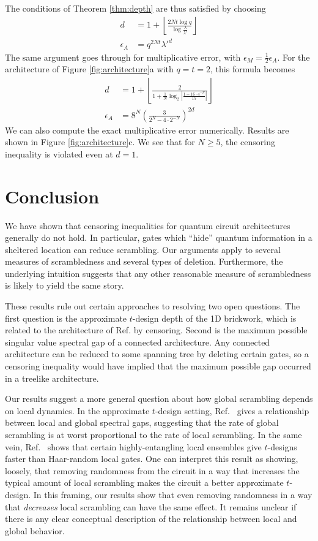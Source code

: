 \documentclass[aps,prx,floatfix,nofootinbib,superscriptaddress,longbibliography]{revtex4-2}
\begin{document}
The conditions of Theorem \ref{thm:depth} are thus satisfied by choosing
\begin{align}
    d &= 1 + \left \lfloor\frac{2Nt \log q}{\log \frac{\lambda}{\lambda'}}\right \rfloor \\
    \epsilon_A &= q^{2Nt}{\lambda'}^d
\end{align}
The same argument goes through for multiplicative error, with $\epsilon_M = \frac{1}{2}\epsilon_A$. For the architecture of Figure \ref{fig:architecture}a with $q = t = 2$, this formula becomes
\begin{align}
    d &= 1 + \left \lfloor
    \frac{2}{1 + \frac{1}{N}\log_2 \left|\frac{1 - 16 \cdot 4^{-N}}{15}\right|}\right \rfloor \\
    \epsilon_A &= 8^{N}\left(\frac{3}{2^N - 4 \cdot 2^{-N}}\right)^{2d}
\end{align}
We can also compute the exact multiplicative error numerically. Results are shown in Figure \ref{fig:architecture}c. We see that for $N \geq 5$, the censoring inequality is violated even at $d = 1$.


\section{Conclusion}
We have shown that censoring inequalities for quantum circuit architectures generally do not hold. In particular, gates which ``hide'' quantum information in a sheltered location can reduce scrambling. Our arguments apply to several measures of scrambledness and several types of deletion. Furthermore, the underlying intuition suggests that any other reasonable measure of scrambledness is likely to yield the same story. 

These results rule out certain approaches to resolving two open questions. The first question is the approximate $t$-design depth of the 1D brickwork, which is related to the architecture of Ref.  by censoring. Second is the maximum possible singular value spectral gap of a connected architecture. Any connected architecture can be reduced to some spanning tree by deleting certain gates, so a censoring inequality would have implied that the maximum possible gap occurred in a treelike architecture.

Our results suggest a more general question about how global scrambling depends on local dynamics. In the approximate $t$-design setting, Ref.~ gives a relationship between local and global spectral gaps, suggesting that the rate of global scrambling is at worst proportional to the rate of local scrambling. In the same vein, Ref.~ shows that certain highly-entangling local ensembles give $t$-designs faster than Haar-random local gates. One can interpret this result as showing, loosely, that removing randomness from the circuit in a way that increases the typical amount of local scrambling makes the circuit a better approximate $t$-design. In this framing, our results show that even removing randomness in a way that \textit{decreases} local scrambling can have the same effect. It remains unclear if there is any clear conceptual description of the relationship between local and global behavior.
\end{document}
